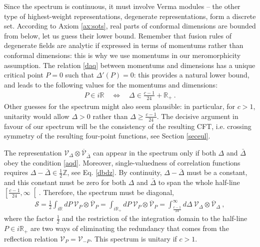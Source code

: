 \documentclass[12pt, a4paper, notitlepage, twoside]{report}
\numberwithin{equation}{section}
\theoremstyle{break}
\begin{document}
Since the spectrum is continuous, it must involve Verma modules -- the other type of highest-weight representations, degenerate representations, form a discrete set. 
According to Axiom \ref{ax:sots}, real parts of conformal dimensions are bounded from below, let us guess their lower bound. Remember that fusion rules of degenerate fields are analytic if expressed in terms of momentums rather than conformal dimensions: this is why we use momentums in our meromorphicity assumption. The relation \eqref{daq} between momentums and dimensions has a unique critical point $P=0$ such that $\Delta'(P)=0$: this provides a natural lower bound, and leads to the following values for the momentums and dimensions:
\begin{align}
 P \in i{\mathbb{R}} \quad \iff \quad \Delta \in \frac{c-1}{24}+\mathbb{R}_+\ .
\label{aqd}
\end{align}
Other guesses for the spectrum might also seem plausible: in particular, for $c>1$, unitarity would allow $\Delta> 0$ rather than $\Delta \geq \frac{c-1}{24}$. 
The decisive argument in favour of our spectrum will be the consistency of the resulting CFT, i.e. 
crossing symmetry of the resulting four-point functions, see Section \ref{seceul}.

The representation $\mathcal{V}_\Delta\otimes \overline{\mathcal{V}}_{\bar{\Delta}}$ can appear in the spectrum only if both 
$\Delta$ and $\bar{\Delta}$ obey the condition \eqref{aqd}. 
Moreover, single-valuedness of correlation functions requires $\Delta-\bar{\Delta}\in {\frac12\mathbb{Z}} $, see Eq. \eqref{dbdz}.
By continuity, $\Delta-\bar{\Delta}$ must be a constant, and this constant must be zero for both $\Delta$ and $\bar{\Delta}$ to span the whole half-line $\left[\frac{c-1}{24},\infty\right[$.
Therefore, the spectrum must be diagonal,
\begin{align}
 \boxed{ \mathcal{S}= \frac12\int_{i{\mathbb{R}}} dP\ \mathcal{V}_P \otimes \overline{\mathcal{V}}_P =\int_{i{\mathbb{R}_+}} dP\ \mathcal{V}_P \otimes \overline{\mathcal{V}}_P = \int_{\frac{c-1}{24}}^\infty d\Delta\ \mathcal{V}_\Delta\otimes \overline{\mathcal{V}}_\Delta} \ ,
\label{sad}
\end{align}
where the  factor $\frac12$ and the restriction of the integration domain to the half-line $P\in i\mathbb{R}_+$ are two ways of
eliminating the redundancy that comes from the reflection relation $\mathcal{V}_P=\mathcal{V}_{-P}$. This spectrum is unitary if $c>1$.
\end{document}
